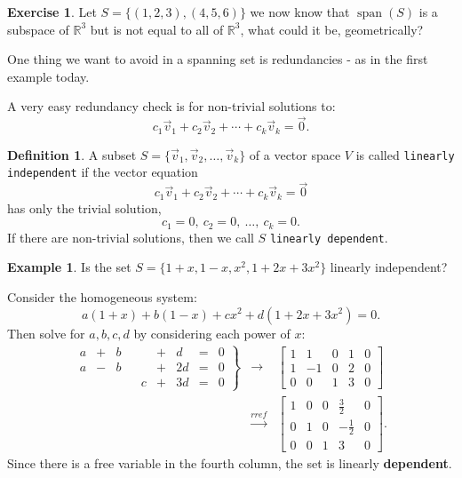\documentclass{beamer}
\newcommand{\R}{\mathbb{R}}
\newcommand{\fn}{\insertframenumber}
\theoremstyle{definition}
\newtheorem{exercise}{Exercise}
\newtheorem*{defn}{Definition}
\newtheorem*{exa}{Example}
\renewcommand{\emph}[1]{{\color{blue}\texttt{#1}}}
\begin{document}
\begin{frame}{\fn}
	\begin{exercise}
		Let $S=\{(1,2,3),(4,5,6)\}$ we now know that $\operatorname{span}(S)$ is a subspace of $\R^3$ but is not equal to all of $\R^3$, what could it be, geometrically?
	\end{exercise}
\end{frame}
\begin{frame}{\fn}
	One thing we want to avoid in a spanning set is redundancies - as in the first example today. 
	
	A very easy redundancy check is for non-trivial solutions to:
		\[c_1\vec v_1+c_2\vec v_2+\cdots + c_k\vec v_k=\vec 0.\]
	\begin{defn}
		A subset $S=\{\vec v_1,\vec v_2,\dots,\vec v_k\}$ of a vector space $V$ is called \emph{linearly independent} if the vector equation
			\[c_1\vec v_1+c_2\vec v_2+\cdots+c_k\vec v_k=\vec 0\]
		has only the trivial solution,
			\[c_1=0,\ c_2=0,\ \dots,\ c_k=0.\]
		If there are non-trivial solutions, then we call $S$ \emph{linearly~dependent}.
	\end{defn}
\end{frame}
\begin{frame}{\fn}
	\begin{exa}
		Is the set $S=\{1+x,1-x,x^2,1+2x+3x^2\}$ linearly independent?
		
		Consider the homogeneous system:
			\[a(1+x)+b(1-x)+cx^2+d(1+2x+3x^2)=0.\]
		Then solve for $a,b,c,d$ by considering each power of $x$:
			$$\begin{array}{rcl}\left.\begin{array}{rcrcrcrcl}
			a&+&b&&&+&d&=&0\\
			a&-&b&&&+&2d&=&0\\
			&&&&c&+&3d&=&0
			\end{array}\right\}&\rightarrow&
			\begin{bmatrix}1 & 1 & 0 & 1 & 0 \\
			1 & -1 & 0 & 2 & 0 \\
			0 & 0 & 1 & 3 & 0\end{bmatrix}
			\\&\xrightarrow{rref}&
			\begin{bmatrix}
				1 & 0 & 0 & \frac{3}{2} & 0 \\
				0 & 1 & 0 & -\frac{1}{2} & 0 \\
				0 & 0 & 1 & 3 & 0
			\end{bmatrix}.
			\end{array}$$
		Since there is a free variable in the fourth column, the set is linearly \textbf{dependent}.
	\end{exa}
\end{frame}
\end{document}

